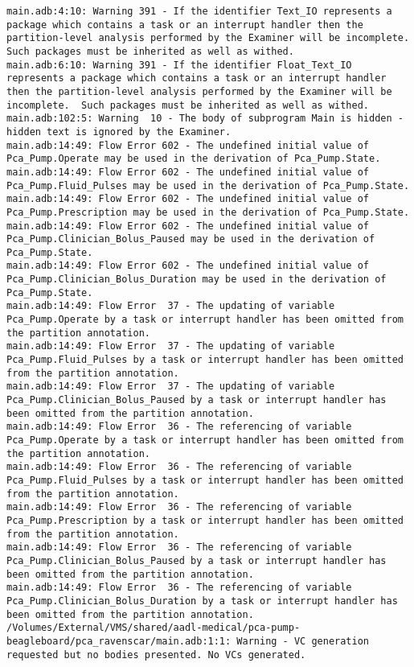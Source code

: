 \begin{lstlisting}
main.adb:4:10: Warning 391 - If the identifier Text_IO represents a package which contains a task or an interrupt handler then the partition-level analysis performed by the Examiner will be incomplete.  Such packages must be inherited as well as withed.
main.adb:6:10: Warning 391 - If the identifier Float_Text_IO represents a package which contains a task or an interrupt handler then the partition-level analysis performed by the Examiner will be incomplete.  Such packages must be inherited as well as withed.
main.adb:102:5: Warning  10 - The body of subprogram Main is hidden - hidden text is ignored by the Examiner.
main.adb:14:49: Flow Error 602 - The undefined initial value of Pca_Pump.Operate may be used in the derivation of Pca_Pump.State.
main.adb:14:49: Flow Error 602 - The undefined initial value of Pca_Pump.Fluid_Pulses may be used in the derivation of Pca_Pump.State.
main.adb:14:49: Flow Error 602 - The undefined initial value of Pca_Pump.Prescription may be used in the derivation of Pca_Pump.State.
main.adb:14:49: Flow Error 602 - The undefined initial value of Pca_Pump.Clinician_Bolus_Paused may be used in the derivation of Pca_Pump.State.
main.adb:14:49: Flow Error 602 - The undefined initial value of Pca_Pump.Clinician_Bolus_Duration may be used in the derivation of Pca_Pump.State.
main.adb:14:49: Flow Error  37 - The updating of variable Pca_Pump.Operate by a task or interrupt handler has been omitted from the partition annotation.
main.adb:14:49: Flow Error  37 - The updating of variable Pca_Pump.Fluid_Pulses by a task or interrupt handler has been omitted from the partition annotation.
main.adb:14:49: Flow Error  37 - The updating of variable Pca_Pump.Clinician_Bolus_Paused by a task or interrupt handler has been omitted from the partition annotation.
main.adb:14:49: Flow Error  36 - The referencing of variable Pca_Pump.Operate by a task or interrupt handler has been omitted from the partition annotation.
main.adb:14:49: Flow Error  36 - The referencing of variable Pca_Pump.Fluid_Pulses by a task or interrupt handler has been omitted from the partition annotation.
main.adb:14:49: Flow Error  36 - The referencing of variable Pca_Pump.Prescription by a task or interrupt handler has been omitted from the partition annotation.
main.adb:14:49: Flow Error  36 - The referencing of variable Pca_Pump.Clinician_Bolus_Paused by a task or interrupt handler has been omitted from the partition annotation.
main.adb:14:49: Flow Error  36 - The referencing of variable Pca_Pump.Clinician_Bolus_Duration by a task or interrupt handler has been omitted from the partition annotation.
/Volumes/External/VMS/shared/aadl-medical/pca-pump-beagleboard/pca_ravenscar/main.adb:1:1: Warning - VC generation requested but no bodies presented. No VCs generated.
\end{lstlisting}



